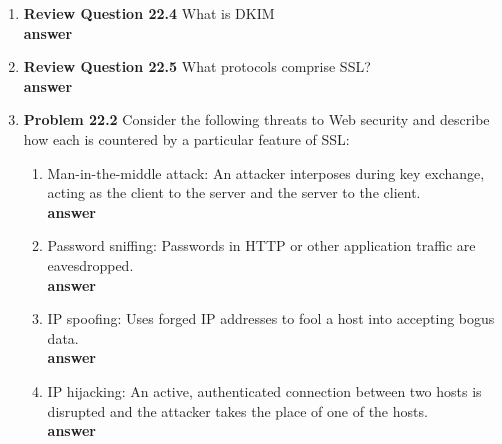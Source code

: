 \documentclass[12pt]{article}
\begin{document}
\renewcommand{\headrulewidth}{0.4pt}
\vspace{-3mm}
\begin{enumerate}
  \item \textbf{Review Question 22.4} What is DKIM \\

  \textbf{answer} \\

  \item \textbf{Review Question 22.5} What protocols comprise SSL? \\

  \textbf{answer} \\

  \item \textbf{Problem 22.2} Consider the following threats to Web security and describe how each is countered by a particular feature of SSL: \\
  \begin{enumerate}
    \item Man-in-the-middle attack: An attacker interposes during key exchange, acting as the client to the server and the server to the client. \\

    \textbf{answer} \\

    \item Password sniffing: Passwords in HTTP or other application traffic are eavesdropped. \\

    \textbf{answer} \\

    \item IP spoofing: Uses forged IP addresses to fool a host into accepting bogus data.\\

    \textbf{answer} \\

    \item IP hijacking: An active, authenticated connection between two hosts is disrupted and the attacker takes the place of one of the hosts.\\

    \textbf{answer} \\


\end{enumerate}
\end{enumerate}
\end{document}
